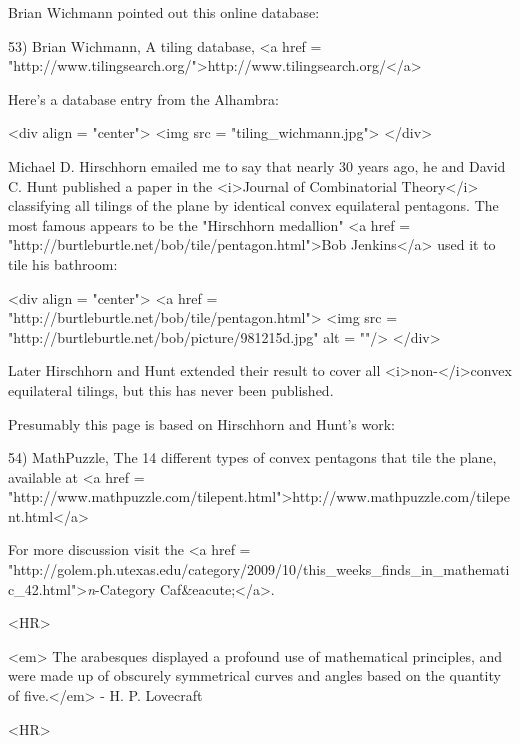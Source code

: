 Brian Wichmann pointed out this online database:

53) Brian Wichmann, A tiling database, 
<a href = "http://www.tilingsearch.org/">http://www.tilingsearch.org/</a>

Here's a database entry from the Alhambra:

<div align = "center">
<img src = "tiling_wichmann.jpg">
</div>

Michael D. Hirschhorn emailed me to say that nearly 30 years ago, he
and David C. Hunt published a paper in the <i>Journal of Combinatorial
Theory</i> classifying all tilings of the plane by identical convex
equilateral pentagons.  The most famous appears to be the "Hirschhorn
medallion"  <a href =
"http://burtleburtle.net/bob/tile/pentagon.html">Bob Jenkins</a> used
it to tile his bathroom:

<div align = "center">
<a href = "http://burtleburtle.net/bob/tile/pentagon.html">
<img src = "http://burtleburtle.net/bob/picture/981215d.jpg" alt = ""/>
</div>

Later Hirschhorn and Hunt extended their result to cover all
<i>non-</i>convex equilateral tilings, but this has never been
published.

Presumably this page is based on Hirschhorn and Hunt's work:

54) MathPuzzle, The 14 different types of convex pentagons that tile
the plane, available at <a href =
"http://www.mathpuzzle.com/tilepent.html">http://www.mathpuzzle.com/tilepent.html</a>

For more discussion visit the <a href =
"http://golem.ph.utexas.edu/category/2009/10/this_weeks_finds_in_mathematic_42.html">\emph{n}-Category
Caf&eacute;</a>.

<HR>

<em>
The arabesques displayed a profound use of mathematical principles, and were made up
of obscurely symmetrical curves and angles based on the quantity of five.</em> -
H. P. Lovecraft


<HR>



